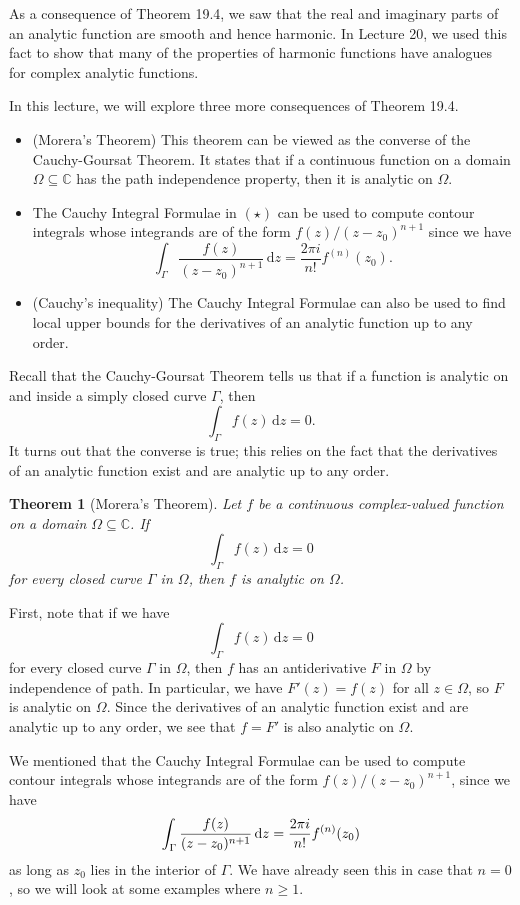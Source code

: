 \documentclass[10pt]{article}
\makeatletter
\newcommand{\C}{\mathbb{C}}
\newcommand{\dd}{\,\mathrm{d}}
\theoremstyle{newstyle}
\newtheorem{thm}{Theorem}[section]
\newenvironment{pf}[1][\proofname]{\par
  \pushQED{\qed}%
  \normalfont \topsep0\p@\relax
  \trivlist
  \item[\hskip\labelsep\scshape
  #1\@addpunct{.}]\ignorespaces
}{%
  \popQED\endtrivlist\@endpefalse
}
\makeatother
\begin{document}
As a consequence of Theorem 19.4, we saw that the real and imaginary parts of an analytic function 
are smooth and hence harmonic. In Lecture 20, we used this fact to show that many 
of the properties of harmonic functions have analogues for complex analytic functions. 

In this lecture, we will explore three more consequences of Theorem 19.4. 
\begin{itemize}
    \item (Morera's Theorem) This theorem can be viewed as the converse of the Cauchy-Goursat Theorem. 
    It states that if a continuous function on a domain $\Omega \subseteq \C$ has the 
    path independence property, then it is analytic on $\Omega$. 
    \item The Cauchy Integral Formulae in $(\star)$ can be used to compute contour integrals 
    whose integrands are of the form $f(z)/(z-z_0)^{n+1}$ since we have 
    \[ \int_\Gamma \frac{f(z)}{(z-z_0)^{n+1}}\dd z = \frac{2\pi i}{n!} f^{(n)}(z_0). \]
    \item (Cauchy's inequality) The Cauchy Integral Formulae can also be used to find 
    local upper bounds for the derivatives of an analytic function up to any order. 
\end{itemize}
Recall that the Cauchy-Goursat Theorem tells us that if a function is analytic on and 
inside a simply closed curve $\Gamma$, then 
\[ \int_\Gamma f(z) \dd z = 0. \]
It turns out that the converse is true; this relies on the fact that the derivatives of 
an analytic function exist and are analytic up to any order. 

\begin{thm}[Morera's Theorem]
Let $f$ be a continuous complex-valued function on a domain $\Omega \subseteq \C$. If 
\[ \int_\Gamma f(z)\dd z = 0 \]
for every closed curve $\Gamma$ in $\Omega$, then $f$ is analytic on $\Omega$. 
\end{thm}
\begin{pf}
First, note that if we have
\[ \int_\Gamma f(z)\dd z = 0 \]
for every closed curve $\Gamma$ in $\Omega$, then $f$ has an antiderivative $F$ in $\Omega$ 
by independence of path. In particular, we have $F'(z) = f(z)$ for all $z \in \Omega$, so 
$F$ is analytic on $\Omega$. Since the derivatives of an analytic function exist and 
are analytic up to any order, we see that $f = F'$ is also analytic on $\Omega$. 
\end{pf}

We mentioned that the Cauchy Integral Formulae can be used to compute contour 
integrals whose integrands are of the form $f(z)/(z-z_0)^{n+1}$, since we have 
\[ \int_\Gamma \frac{f(z)}{(z-z_0)^{n+1}}\,{\rm d}z = \frac{2\pi i}{n!} f^{(n)}(z_0) \]
as long as $z_0$ lies in the interior of $\Gamma$. We have already seen this in
case that $n = 0$, so we will look at some examples where $n \geq 1$. 
\end{document}
